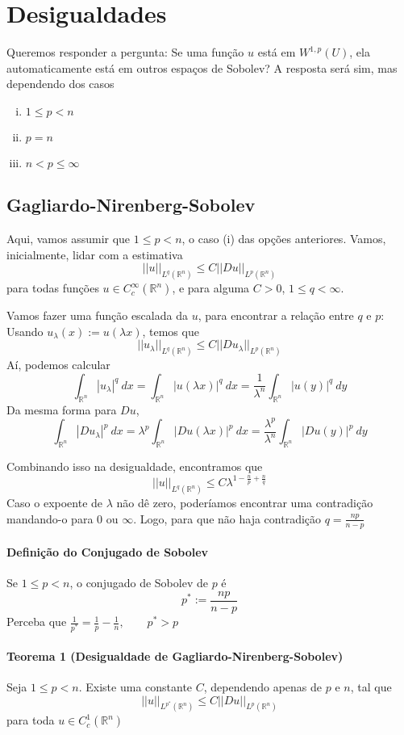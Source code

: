 \documentclass[a4paper, 11pt]{book}
\newcommand{\Rn}{{\mathbb{R}^n}}
\newcommand{\nor}[2]{||#1||_{#2}}
\begin{document}
\section{Desigualdades}

Queremos responder a pergunta: Se uma função $ u $ está em $ W^{1,p}(U) $, ela automaticamente está em outros espaços de Sobolev? A resposta será sim, mas dependendo dos casos \begin{enumerate}[(i)]
	\item $ 1 \leq p < n $
	\item $ p = n $
	\item $ n < p \leq \infty $
\end{enumerate}

\subsection{Gagliardo-Nirenberg-Sobolev}

Aqui, vamos assumir que $ 1 \leq p < n $, o caso (i) das opções anteriores. Vamos, inicialmente, lidar com a estimativa \[ \nor{u}{L^q(\Rn)} \leq C \nor{Du}{L^p(\Rn)}\] para todas funções $ u \in C^\infty_c(\Rn) $, e para alguma $ C>0 $, $ 1 \leq q < \infty $.

Vamos fazer uma função escalada da $ u $, para encontrar a relação entre $ q $ e $ p $: Usando $ u_{\lambda}(x):=u(\lambda x) $, temos que \[ \nor{u_{\lambda}}{L^q(\Rn)} \leq C \nor{Du_\lambda}{L^p(\Rn)}\] Aí, podemos calcular \[ \int_\Rn |u_{\lambda}|^q\ dx =  \int_\Rn |u(\lambda x)|^q\ dx = \frac{1}{\lambda^n} \int_\Rn |u(y)|^q\ dy\] Da mesma forma para $ Du $, \[ \int_\Rn |Du_{\lambda}|^p\ dx =  \lambda^p \int_\Rn |Du(\lambda x)|^p\ dx = \frac{\lambda^p}{\lambda^n} \int_\Rn |Du(y)|^p\ dy\]

Combinando isso na desigualdade, encontramos que \[ \nor{u}{L^q(\Rn)} \leq C \lambda^{1 - \frac{n}{p} + \frac{n}{q} }\] Caso o expoente de $\lambda$ não dê zero, poderíamos encontrar uma contradição mandando-o para 0 ou $\infty$. Logo, para que não haja contradição $ q = \frac{np}{n-p} $

\paragraph{Definição do Conjugado de Sobolev} Se $ 1\leq p < n $, o conjugado de Sobolev de $p$ é \[ p^* := \frac{np}{n-p} \] Perceba que $ \frac{1}{p^*} = \frac{1}{p} - \frac{1}{n}, \qquad p^* > p $


\paragraph{Teorema 1 (Desigualdade de Gagliardo-Nirenberg-Sobolev)}\label{t:sobolev-ineq-t1} Seja $ 1 \leq p < n $. Existe uma constante $C$, dependendo apenas de $p$ e $n$, tal que \[ ||u||_{L^{p^*}(\Rn)} \leq C \left|\left|Du\right|\right|_{L^{p}(\Rn)} \] para toda $u \in C^1_c(\Rn)$
\end{document}
